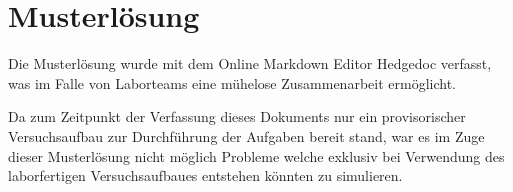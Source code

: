 \chapter{Musterlösung}

Die Musterlösung wurde mit dem Online Markdown Editor Hedgedoc verfasst, was im Falle von Laborteams eine mühelose Zusammenarbeit ermöglicht.

Da zum Zeitpunkt der Verfassung dieses Dokuments nur ein provisorischer Versuchsaufbau zur Durchführung der Aufgaben bereit stand, war es im Zuge dieser Musterlösung nicht möglich Probleme welche exklusiv bei Verwendung des laborfertigen Versuchsaufbaues entstehen könnten zu simulieren.

